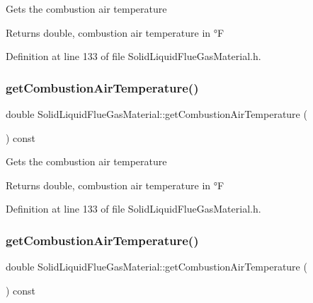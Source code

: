 Gets the combustion air temperature \begin{DoxyReturn}{Returns}
double, combustion air temperature in °F 
\end{DoxyReturn}


Definition at line 133 of file Solid\+Liquid\+Flue\+Gas\+Material.\+h.

\mbox{\label{class_solid_liquid_flue_gas_material_a8757b831e5a2ef26dbb0cf271c0e8207}} 
\subsubsection{\texorpdfstring{get\+Combustion\+Air\+Temperature()}{getCombustionAirTemperature()}\hspace{0.1cm}{\footnotesize\ttfamily [2/3]}}
{\footnotesize\ttfamily double Solid\+Liquid\+Flue\+Gas\+Material\+::get\+Combustion\+Air\+Temperature (\begin{DoxyParamCaption}{ }\end{DoxyParamCaption}) const\hspace{0.3cm}{\ttfamily [inline]}}

Gets the combustion air temperature \begin{DoxyReturn}{Returns}
double, combustion air temperature in °F 
\end{DoxyReturn}


Definition at line 133 of file Solid\+Liquid\+Flue\+Gas\+Material.\+h.

\mbox{\label{class_solid_liquid_flue_gas_material_a8757b831e5a2ef26dbb0cf271c0e8207}} 
\subsubsection{\texorpdfstring{get\+Combustion\+Air\+Temperature()}{getCombustionAirTemperature()}\hspace{0.1cm}{\footnotesize\ttfamily [3/3]}}
{\footnotesize\ttfamily double Solid\+Liquid\+Flue\+Gas\+Material\+::get\+Combustion\+Air\+Temperature (\begin{DoxyParamCaption}{ }\end{DoxyParamCaption}) const\hspace{0.3cm}{\ttfamily [inline]}}


